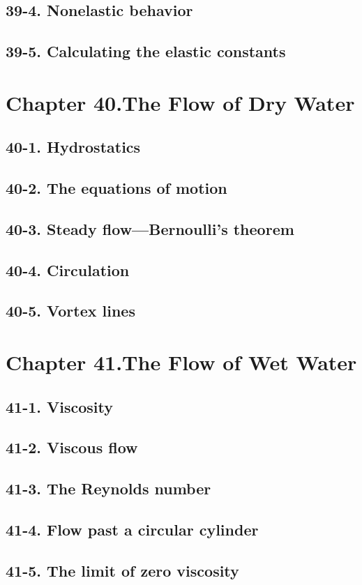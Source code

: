\documentclass{article}
\begin{document}
\subsection{39-4. Nonelastic behavior}
\subsection{39-5. Calculating the elastic constants}
\section{Chapter 40.The Flow of Dry Water}
\subsection{40-1. Hydrostatics}
\subsection{40-2. The equations of motion}
\subsection{40-3. Steady flow—Bernoulli’s theorem}
\subsection{40-4. Circulation}
\subsection{40-5. Vortex lines}
\section{Chapter 41.The Flow of Wet Water}
\subsection{41-1. Viscosity}
\subsection{41-2. Viscous flow}
\subsection{41-3. The Reynolds number}
\subsection{41-4. Flow past a circular cylinder}
\subsection{41-5. The limit of zero viscosity}
\end{document}
